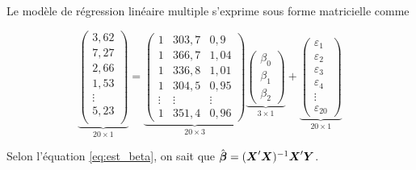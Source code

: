 Le modèle de régression linéaire multiple s'exprime sous forme matricielle comme


$$
\underbrace{\left(
\begin{array}{c}
3,62  \\
7,27  \\
2,66 \\
1,53 \\
\vdots \\
5,23  \\
\end{array} \right)}_{20\times 1}
 =  \underbrace{\left(\begin{array}{ccc}
            1	&      303,7  & 0,9     \\
            1	&      366,7  & 1,04    \\
            1 &         336,8 & 1,01 \\
            1 &           304,5 & 0,95 \\
            \vdots & \vdots & \vdots   \\
            1	&      351,4  & 0,96
\end{array}\right)}_{20\times 3}
\underbrace{\left(\begin{array}{c}
\beta_0 \\
\beta_1 \\
\beta_2
\end{array} \right)}_{3\times 1}+
\underbrace{\left(\begin{array}{c}
\varepsilon_1 \\
\varepsilon_2 \\
\varepsilon_3 \\
\varepsilon_4 \\
\vdots \\
\varepsilon_{20}
 \end{array}
 \right)}_{20\times 1}
 $$


Selon l'équation \ref{eq:est_beta}, on sait que $\hat{\mbox{\boldmath$\beta$}}=(\mbox{\boldmath$X$\unboldmath}'\mbox{\boldmath$X$\unboldmath})^{-1}\mbox{\boldmath$X$\unboldmath}' \mbox{\boldmath$Y$\unboldmath}$.

